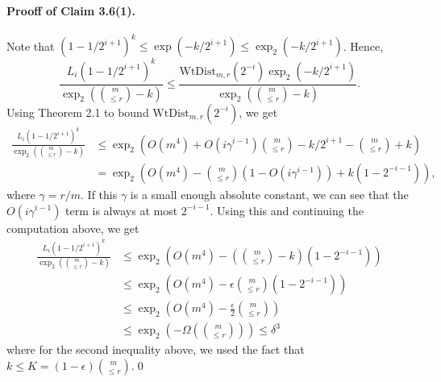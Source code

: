 \paragraph{Prooff of Claim 3.6(1).} Note that $(1-1/2^{i+1})^k\le\exp(-k/2^{i+1})\le\operatorname{exp}_2(-k/2^{i+1})$. Hence,
\[\frac{L_i(1-1/2^{i+1})^k}{\operatorname{exp}_2\left(\binom m{\le r}-k\right)}\le\frac{\mathrm{WtDist}_{m,r}(2^{-i})\operatorname{exp}_2(-k/2^{i+1})}{\operatorname{exp}_2\left(\binom m{\le r}-k\right)}.\]
Using Theorem 2.1 to bound $\mathrm{WtDist}_{m,r}(2^{-i})$, we get
\begin{align*}\frac{L_i(1-1/2^{i+1})^k}{\operatorname{exp}_2\left(\binom m{\le r}-k\right)}&\le\operatorname{exp}_2\left(O(m^4)+O(i\gamma^{i-1})\binom m{\le r}-k/2^{i+1}-\binom m{\le r}+k\right)\\&=\operatorname{exp}_2\left(O(m^4)-\binom m{\le r}(1-O(i\gamma^{i-1}))+k(1-2^{-i-1})\right),\end{align*}
where $\gamma=r/m$. If this $\gamma$ is a small enough absolute constant, we can see that the $O(i\gamma^{i-1})$ term is always at most $2^{-i-1}$. Using this and continuing the computation above, we get
\begin{align*}\frac{L_i(1-1/2^{i+1})^k}{\operatorname{exp}_2\left(\binom m{\le r}-k\right)}&\le\operatorname{exp}_2\left(O(m^4)-\left(\binom m{\le r}-k\right)(1-2^{-i-1})\right)\\&\le\operatorname{exp}_2\left(O(m^4)-\epsilon\binom m{\le r}(1-2^{-i-1})\right)\\&\le\operatorname{exp}_2\left(O(m^4)-\frac\epsilon2\binom m{\le r}\right)\\&\le\operatorname{exp}_2\left(-\Omega\left(\binom m{\le r}\right)\right)\le\delta^3\end{align*}
where for the second inequality above, we used the fact that $k\le K=(1-\epsilon)\binom m{\le r}$.\qed
